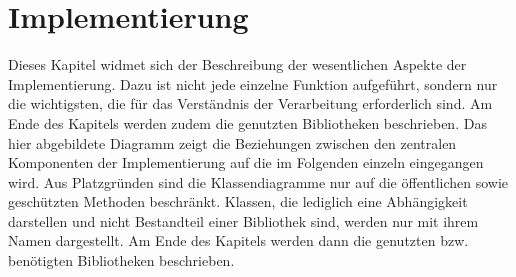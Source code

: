 \chapter{Implementierung}
Dieses Kapitel widmet sich der Beschreibung der wesentlichen Aspekte der Implementierung.
Dazu ist nicht jede einzelne Funktion aufgeführt, sondern nur die wichtigsten, die für das Verständnis der Verarbeitung erforderlich sind.
Am Ende des Kapitels werden zudem die genutzten Bibliotheken beschrieben.
Das hier abgebildete Diagramm zeigt die Beziehungen zwischen den zentralen Komponenten der Implementierung auf die im Folgenden einzeln eingegangen wird.
Aus Platzgründen sind die Klassendiagramme nur auf die öffentlichen sowie geschützten Methoden beschränkt.
Klassen, die lediglich eine Abhängigkeit darstellen und nicht Bestandteil einer Bibliothek sind, werden nur mit ihrem Namen dargestellt.
Am Ende des Kapitels werden dann die genutzten bzw. benötigten Bibliotheken beschrieben.














